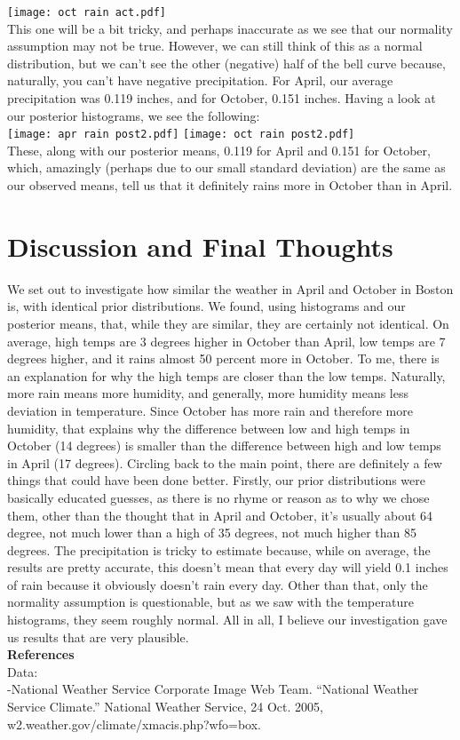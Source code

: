 \documentclass[12pt]{article}
\begin{document}
\begin{flushleft}
\texttt{[image: oct rain act.pdf]}\\
This one will be a bit tricky, and perhaps inaccurate as we see that our normality assumption may not be true. However, we can still think of this as a normal distribution, but we can't see the other (negative) half of the bell curve because, naturally, you can't have negative precipitation. For April, our average precipitation was 0.119 inches, and for October, 0.151 inches. Having a look at our posterior histograms, we see the following:\\
\texttt{[image: apr rain post2.pdf]}
\texttt{[image: oct rain post2.pdf]}\\
These, along with our posterior means, 0.119 for April and 0.151 for October, which, amazingly (perhaps due to our small standard deviation) are the same as our observed means, tell us that it definitely rains more in October than in April.\\

\section{Discussion and Final Thoughts}\label{sec:chapter}
We set out to investigate how similar the weather in April and October in Boston is, with identical prior distributions. We found, using histograms and our posterior means, that, while they are similar, they are certainly not identical. On average, high temps are 3 degrees higher in October than April, low temps are 7 degrees higher, and it rains almost 50 percent more in October. To me, there is an explanation for why the high temps are closer than the low temps. Naturally, more rain means more humidity, and generally, more humidity means less deviation in temperature. Since October has more rain and therefore more humidity, that explains why the difference between low and high temps in October (14 degrees) is smaller than the difference between high and low temps in April (17 degrees). Circling back to the main point, there are definitely a few things that could have been done better. Firstly, our prior distributions were basically educated guesses, as there is no rhyme or reason as to why we chose them, other than the thought that in April and October, it's usually about 64 degree, not much lower than a high of 35 degrees, not much higher than 85 degrees. The precipitation is tricky to estimate because, while on average, the results are pretty accurate, this doesn't mean that every day will yield 0.1 inches of rain because it obviously doesn't rain every day. Other than that, only the normality assumption is questionable, but as we saw with the temperature histograms, they seem roughly normal. All in all, I believe our investigation gave us results that are very plausible.\\
\textbf{References}\\
Data:\\
-National Weather Service Corporate Image Web Team. “National Weather Service Climate.” National Weather Service, 24 Oct. 2005, w2.weather.gov/climate/xmacis.php?wfo=box.\\
\end{flushleft}
\end{document}
